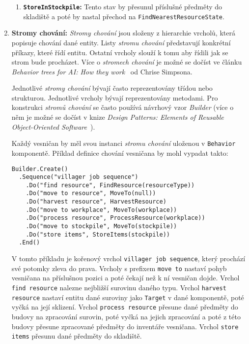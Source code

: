 \begin{enumerate}
\begin{enumerate}
        \item \textbf{\texttt{StoreInStockpile}:} Tento stav by přesunul příslušné předměty do skladiště a poté by nastal přechod na \texttt{FindNearestResourceState}.
    \end{enumerate}

    \item \textbf{Stromy chování:} \textit{Stromy chování} jsou složeny z hierarchie vrcholů, která popisuje chování dané entity. Listy \textit{stromu chování} představují konkrétní příkazy, které řídí entitu. Ostatní vrcholy slouží k tomu aby řídili jak se strom bude procházet. Více o \textit{stromech chování} je možné se dočíst ve článku \textit{Behavior trees for AI: How they work}~\cite{BehaviorTrees} od Chrise Simpsona.

    Jednotlivé \textit{stromy chování} bývají často reprezentovány třídou nebo strukturou. Jednotlivé vrcholy bývají reprezentovány metodami. Pro konstrukci \textit{stromů chování} se často používá návrhový vzor \textit{Builder} (více o něm je možné se dočíst v knize \textit{Design Patterns: Elements of Reusable Object-Oriented Software}~\cite{gamma1994design}).
    
    Každý vesničan by měl svou instanci \textit{stromu chování} uloženou v \texttt{Behavior} komponentě. Příklad definice chování vesničana by mohl vypadat takto:

    \begin{verbatim}
Builder.Create()
  .Sequence("villager job sequence")
    .Do("find resource", FindResource(resourceType))
    .Do("move to resource", MoveTo(null))
    .Do("harvest resource", HarvestResource)
    .Do("move to workplace", MoveTo(workplace))
    .Do("process resource", ProcessResource(workplace))
    .Do("move to stockpile", MoveTo(stockpile))
    .Do("store items", StoreItems(stockpile))
  .End()
    \end{verbatim}

    V tomto příkladu je kořenový vrchol \texttt{villager job sequence}, který prochází své potomky zleva do prava. Vrcholy s prefixem \texttt{move to} nastaví pohyb vesničana na příslušnou pozici a poté čekají než k ní vesničan dojde. Vrchol \texttt{find resource} nalezne nejbližší surovinu daného typu. Vrchol \texttt{harvest resource} nastaví entitu dané suroviny jako \texttt{Target} v dané komponentě, poté vyčká na její sklizení. Vrchol \texttt{process resource} přesune dané předměty do budovy na zpracování surovin, poté vyčká na jejich zpracování a poté z této budovy přesune zpracované předměty do inventáře vesničana. Vrchol \texttt{store items} přesunu dané předměty do skladiště.
\end{enumerate}

